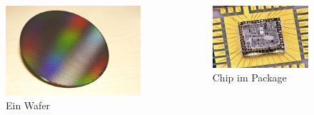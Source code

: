 \begin{frame}
	\begin{columns}
		\begin{column}{.5\textwidth}
			\begin{figure}
				\centering
				\includegraphics[width=.85\textwidth]{images/silicon_waver.jpg}
				\caption{Ein Wafer}
			\end{figure}
		\end{column}
		\begin{column}{.5\textwidth}
			\begin{figure}
				\centering
				\includegraphics[width=.9\textwidth]{images/chip_with_bonding.jpg}
				\caption{Chip im Package}
			\end{figure}
		\end{column}
	\end{columns}
\end{frame}

